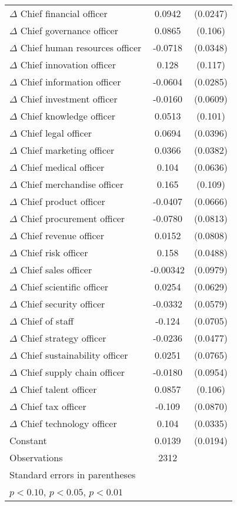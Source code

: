 {\begin{longtable}{l*{1}{cc}}
$\Delta$ Chief financial officer&   0.0942\sym{***}& (0.0247)\\
$\Delta$ Chief governance officer&   0.0865         &  (0.106)\\
$\Delta$ Chief human resources officer&  -0.0718\sym{**} & (0.0348)\\
$\Delta$ Chief innovation officer&    0.128         &  (0.117)\\
$\Delta$ Chief information officer&  -0.0604\sym{**} & (0.0285)\\
$\Delta$ Chief investment officer&  -0.0160         & (0.0609)\\
$\Delta$ Chief knowledge officer&   0.0513         &  (0.101)\\
$\Delta$ Chief legal officer&   0.0694\sym{*}  & (0.0396)\\
$\Delta$ Chief marketing officer&   0.0366         & (0.0382)\\
$\Delta$ Chief medical officer&    0.104         & (0.0636)\\
$\Delta$ Chief merchandise officer&    0.165         &  (0.109)\\
$\Delta$ Chief product officer&  -0.0407         & (0.0666)\\
$\Delta$ Chief procurement officer&  -0.0780         & (0.0813)\\
$\Delta$ Chief revenue officer&   0.0152         & (0.0808)\\
$\Delta$ Chief risk officer&    0.158\sym{***}& (0.0488)\\
$\Delta$ Chief sales officer& -0.00342         & (0.0979)\\
$\Delta$ Chief scientific officer&   0.0254         & (0.0629)\\
$\Delta$ Chief security officer&  -0.0332         & (0.0579)\\
$\Delta$ Chief of staff&   -0.124\sym{*}  & (0.0705)\\
$\Delta$ Chief strategy officer&  -0.0236         & (0.0477)\\
$\Delta$ Chief sustainability officer&   0.0251         & (0.0765)\\
$\Delta$ Chief supply chain officer&  -0.0180         & (0.0954)\\
$\Delta$ Chief talent officer&   0.0857         &  (0.106)\\
$\Delta$ Chief tax officer&   -0.109         & (0.0870)\\
$\Delta$ Chief technology officer&    0.104\sym{***}& (0.0335)\\
Constant        &   0.0139         & (0.0194)\\
\midrule
Observations    &     2312         &         \\
\bottomrule
\multicolumn{3}{l}{\footnotesize Standard errors in parentheses}\\
\multicolumn{3}{l}{\footnotesize \sym{*} \(p<0.10\), \sym{**} \(p<0.05\), \sym{***} \(p<0.01\)}\\
\end{longtable}
}
